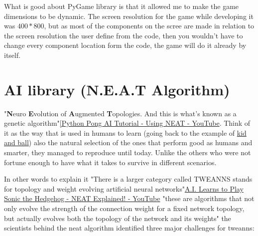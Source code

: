 What is good about PyGame library is that it allowed me to make the game dimensions to be dynamic. The screen resolution for the game while developing it was $400*800$, but as most of the components on the scree are made in relation to the screen resolution the user define from the code, then you wouldn't have to change every component location form the code, the game will do it already by itself. 

\section{AI library (N.E.A.T Algorithm)}\label{sec:ai-library-neat-algorithm}
"\textbf{N}euro \textbf{E}volution of \textbf{A}ugmented \textbf{T}opologies. And this is what's known as a genetic algorithm"\href{https://www.youtube.com/watch?v=2f6TmKm7yx0}{[Python Pong AI Tutorial - Using NEAT - YouTube}. Think of it as the way that is used in humans to learn (going back to the example of \hyperref[sec:ai-life-example]{kid and ball}) also the natural selection of the ones that perform good as humans and smarter, they managed to reproduce until today. Unlike the others who were not fortune enough to have what it takes to survive in different scenarios.

In other words to explain it "There is a larger category called TWEANNS stands for topology and weight evolving artificial neural networks"\href{https://www.youtube.com/watch?v=5RR1T_-zVws&}{A.I. Learns to Play Sonic the Hedgehog - NEAT Explained! - YouTube} "these are algorithms that not only evolve the strength of the connection weight for a fixed network topology, but actually evolves both the topology of the network and its weights" the scientists behind the neat algorithm identified three major challenges for tweanns:

